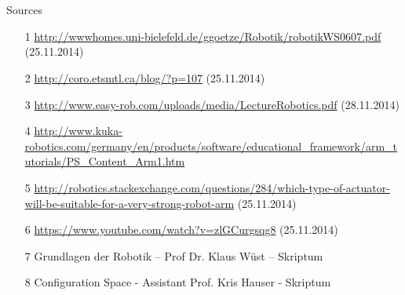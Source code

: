 \documentclass[%
  professionalfonts,%
  xcolor={%
    usenames,%
    dvipsnames,%
    svgnames,%
    table,%
    hyperref%
  }%
]{beamer}
\begin{document}
\section{}
\begin{frame}{Sources}
\begin{itemize}
  \item[1] \url{http://wwwhomes.uni-bielefeld.de/ggoetze/Robotik/robotikWS0607.pdf} (25.11.2014)
  \item[2] \url{http://coro.etsmtl.ca/blog/?p=107} (25.11.2014)
  \item[3] \url{http://www.easy-rob.com/uploads/media/LectureRobotics.pdf} (28.11.2014)
  \item[4] \url{ http://www.kuka-robotics.com/germany/en/products/software/educational_framework/arm_tutorials/PS_Content_Arm1.htm}
  \item[5] \url{http://robotics.stackexchange.com/questions/284/which-type-of-actuator-will-be-suitable-for-a-very-strong-robot-arm} (25.11.2014)
  \item[6] \url{https://www.youtube.com/watch?v=zlGCurgsqg8} (25.11.2014)
  \item[7] Grundlagen der Robotik – Prof Dr. Klaus Wüst – Skriptum
  \item[8] Configuration Space - Assistant Prof. Kris Hauser - Skriptum
\end{itemize}
\end{frame}


\begin{frame}
\Huge{}
\end{frame}
\end{document}
